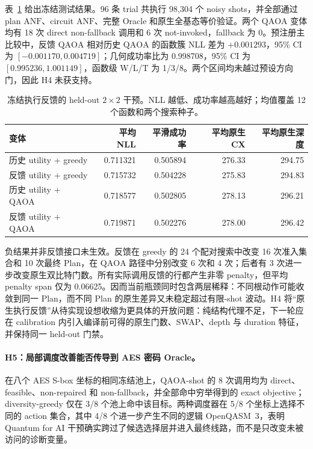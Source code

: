 \documentclass[UTF8,fontset=fandol,11pt]{ctexart}
\newcommand{\anf}{\ensuremath{\mathrm{ANF}}}
\newcommand{\qaoa}{\ensuremath{\mathrm{QAOA}}}
\begin{document}
表~\ref{tab:execution-feedback-zh} 给出冻结测试结果。96 条 trial 共执行 98,304 个 noisy shots，并全部通过 plan \anf{}、circuit \anf{}、完整 Oracle 和原生全基态等价验证。两个 \qaoa{} 变体均有 18 次 direct non-fallback 调用和 6 次 not-invoked，fallback 为 0。预注册主比较中，反馈 \qaoa{} 相对历史 \qaoa{} 的函数簇 NLL 差为 $+0.001293$，95\% CI 为 $[-0.001170,0.004719]$；几何成功率比为 0.998708，95\% CI 为 $[0.995236,1.001149]$，函数级 W/L/T 为 1/3/8。两个区间均未越过预设方向门，因此 H4 未获支持。

\begin{table}[H]
\centering
\small
\caption{冻结执行反馈的 held-out $2\times2$ 干预。NLL 越低、成功率越高越好；均值覆盖 12 个函数和两个搜索种子。}
\label{tab:execution-feedback-zh}
\begin{tabular}{lrrrr}
\toprule
变体 & 平均 NLL & 平滑成功率 & 平均原生 CX & 平均原生深度 \\
\midrule
历史 utility + greedy & 0.711321 & 0.505894 & 276.33 & 294.75 \\
反馈 utility + greedy & 0.715732 & 0.504228 & 275.83 & 294.83 \\
历史 utility + \qaoa{} & 0.718577 & 0.502805 & 278.13 & 296.21 \\
反馈 utility + \qaoa{} & 0.719871 & 0.502276 & 278.00 & 296.42 \\
\bottomrule
\end{tabular}
\end{table}

负结果并非反馈接口未生效。反馈在 greedy 的 24 个配对搜索中改变 16 次准入集合和 10 次最终 Plan，在 \qaoa{} 路径中分别改变 6 次和 4 次；后者有 3 次进一步改变原生双比特门数。所有实际调用反馈的行都产生非零 penalty，但平均 penalty span 仅为 0.06625。因而当前瓶颈同时包含两层稀释：不同根动作可能收敛到同一 Plan，而不同 Plan 的原生差异又未稳定超过有限-shot 波动。H4 将“原生执行反馈”从待实现设想收缩为更具体的开放问题：纯结构代理不足，下一轮应在 calibration 内引入编译前可得的原生门数、SWAP、depth 与 duration 特征，并保持同一 held-out 门禁。

\paragraph{H5：局部调度改善能否传导到 AES 密码 Oracle。}
在八个 AES S-box 坐标的相同冻结池上，\qaoa{}-shot 的 8 次调用均为 direct、feasible、non-repaired 和 non-fallback，并全部命中穷举得到的 exact objective；diversity-greedy 仅在 3/8 个池上命中该目标。两种调度器在 5/8 个坐标上选择不同的 action 集合，其中 4/8 个进一步产生不同的逻辑 OpenQASM~3，表明 Quantum for AI 干预确实跨过了候选选择层并进入最终线路，而不是只改变未被访问的诊断变量。
\end{document}
